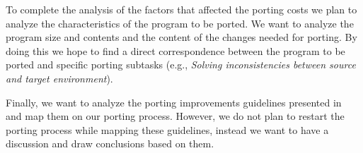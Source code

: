 To complete the analysis of the factors that affected the porting costs we plan
to analyze the characteristics of the program to be ported. We want to analyze
the program size and contents and the content of the changes needed for porting.
By doing this we hope to find a direct correspondence between the program to be
ported and specific porting subtasks (e.g., \textit{Solving inconsistencies
between source and target environment}).

Finally, we want to analyze the porting improvements guidelines presented
in~\cite{b1} and map them on our porting process. However, we do not plan to
restart the porting process while mapping these guidelines, instead we want to
have a discussion and draw conclusions based on them.
